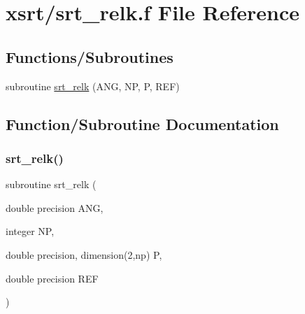 \hypertarget{srt__relk_8f}{}\section{xsrt/srt\+\_\+relk.f File Reference}
\label{srt__relk_8f}
\subsection*{Functions/\+Subroutines}
\begin{DoxyCompactItemize}
\item 
subroutine \hyperlink{srt__relk_8f_a8abaf11c5bb9592dbc19a8ad9e02844e}{srt\+\_\+relk} (A\+NG, NP, P, R\+EF)
\end{DoxyCompactItemize}


\subsection{Function/\+Subroutine Documentation}
\mbox{\label{srt__relk_8f_a8abaf11c5bb9592dbc19a8ad9e02844e}} 
\subsubsection{\texorpdfstring{srt\+\_\+relk()}{srt\_relk()}}
{\footnotesize\ttfamily subroutine srt\+\_\+relk (\begin{DoxyParamCaption}\item[{double precision}]{A\+NG,  }\item[{integer}]{NP,  }\item[{double precision, dimension(2,np)}]{P,  }\item[{double precision}]{R\+EF }\end{DoxyParamCaption})}

